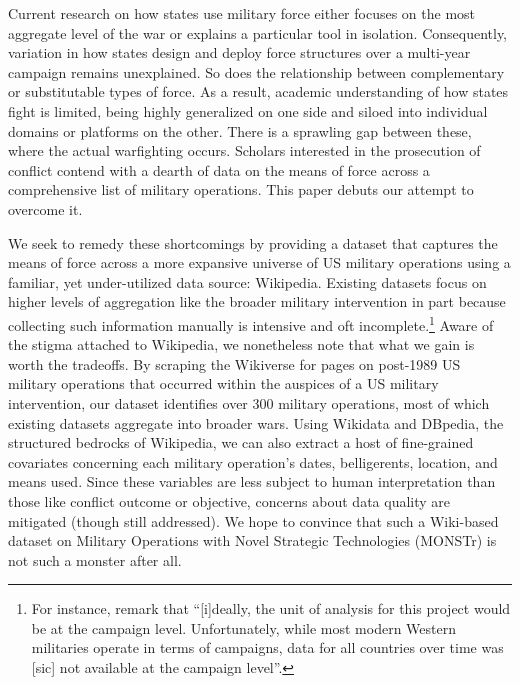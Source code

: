 \documentclass[fleqn,12pt]{article}
\begin{document}
Current research on how states use military force either focuses on the most aggregate level of the war or explains a particular tool in isolation. Consequently, variation in how states design and deploy force structures over a multi-year campaign remains unexplained. So does the relationship between complementary or substitutable types of force. As a result, academic understanding of how states fight is limited, being highly generalized on one side and siloed into individual domains or platforms on the other. There is a sprawling gap between these, where the actual warfighting occurs. Scholars interested in the prosecution of conflict contend with a dearth of data on the means of force across a comprehensive list of military operations. This paper debuts our attempt to overcome it.

We seek to remedy these shortcomings by providing a dataset that captures the means of force across a more expansive universe of US military operations using a familiar, yet under-utilized data source: Wikipedia. Existing datasets focus on higher levels of aggregation like the broader military intervention in part because collecting such information manually is intensive and oft incomplete.\footnote{For instance, \citet[549]{AllenMM17} remark that ``[i]deally, the unit of analysis for this project would be at the campaign level. Unfortunately, while most modern Western militaries operate in terms of campaigns, data for all countries over time was [sic] not available at the campaign level”.} Aware of the stigma attached to Wikipedia, we nonetheless note that what we gain is worth the tradeoffs. By scraping the Wikiverse for pages on post-1989 US military operations that occurred within the auspices of a US military intervention, our dataset identifies over 300 military operations, most of which existing datasets aggregate into broader wars. Using Wikidata and DBpedia, the structured bedrocks of Wikipedia, we can also extract a host of fine-grained covariates concerning each military operation's dates, belligerents, location, and means used. Since these variables are less subject to human interpretation than those like conflict outcome or objective, concerns about data quality are mitigated (though still addressed). We hope to convince that such a Wiki-based dataset on Military Operations with Novel Strategic Technologies (MONSTr) is not such a monster after all.
	
\end{document}
